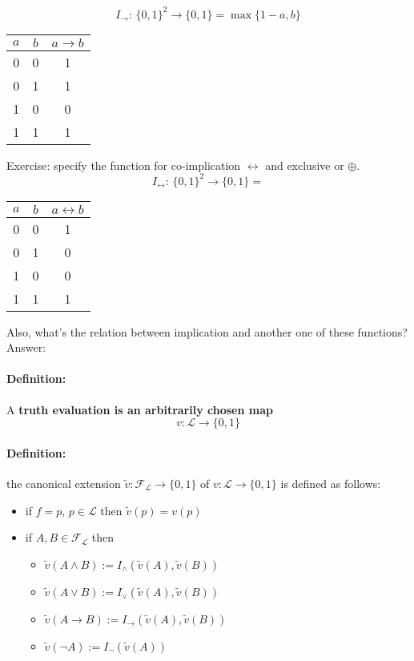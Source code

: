 \documentclass[11pt]{article}
\begin{document}
	$$ I_{\rightarrow} : \, \{0,1\}^2 \rightarrow \{0,1\} = \max\{1-a, b\}$$
	\begin{center}
		\begin{tabular}{c c | c}
			$a$ & $b$ & $a \rightarrow b$ \\
			\hline 
			0 & 0 & 1 \\
			0 & 1 & 1 \\
			1 & 0 & 0 \\
			1 & 1 & 1
		\end{tabular}
	\end{center}
	
	\newpage
	
	Exercise: specify the function for co-implication $\leftrightarrow$ and exclusive or $\oplus$.\\
	$$ I_{\leftrightarrow} : \, \{0,1\}^2 \rightarrow \{0,1\} = $$
	\begin{center}
		\begin{tabular}{c c | c}
			$a$ & $b$ & $a \leftrightarrow b$ \\
			\hline 
			0 & 0 & 1 \\
			0 & 1 & 0\\
			1 & 0 & 0\\
			1 & 1 & 1
		\end{tabular}
	\end{center}
	
	Also, what's the relation between implication and another one of these functions?\\
	Answer:
	
	\newpage
	
	\paragraph{Definition:} A \textbf{truth evaluation is an arbitrarily chosen map} 
	$$v: \mathcal{L} \rightarrow \{0,1\}$$
	
	\paragraph{Definition:} the canonical extension $\tilde{v}: \mathcal{F}_{\mathcal{L}} \rightarrow \{0,1\}$ of $v : \mathcal{L} \rightarrow \{0,1\}$ is defined as follows:
	\begin{itemize}
		\item if $f = p$, $p \in \mathcal{L}$ then $\tilde{v} (p) = v(p)$
		\item if $A, B \in \mathcal{F}_{\mathcal{L}}$ then 
		\begin{itemize}[label=]
			\item $\tilde{v} (A \wedge B) := I_\wedge (\tilde{v} (A), \tilde{v} (B))$
			\item $\tilde{v} (A \vee B) := I_\vee (\tilde{v} (A), \tilde{v} (B))$
			\item $\tilde{v} (A \rightarrow B) := I_\rightarrow (\tilde{v} (A), \tilde{v} (B))$
			\item $\tilde{v} (\neg A) := I_\neg (\tilde{v} (A))$
		\end{itemize}
	\end{itemize}
	
\end{document}
